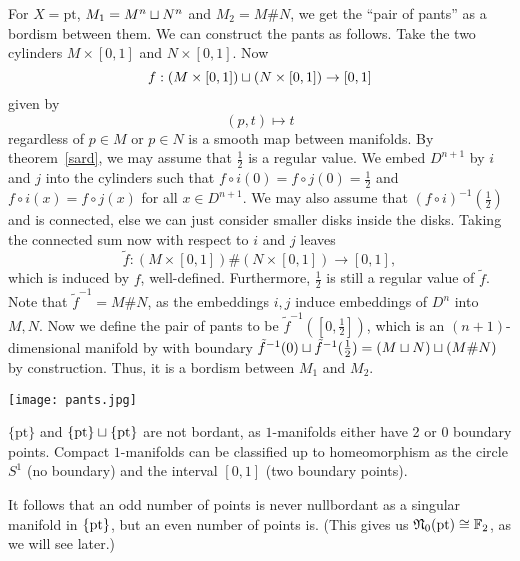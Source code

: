 \documentclass[a4paper,11pt]{article}
\begin{document}
\begin{example}\label{pants}
    For \(X=\mathrm{pt}\), \(M_1=M^n\sqcup N^n\) and \(M_2=M\# N\), we get the \enquote{pair of pants} as a bordism between them. We can construct the pants as follows. Take the two cylinders \(M\times [0,1]\) and \(N\times[0,1]\). Now \[f:(M\times[0,1])\sqcup(N\times[0,1])\to [0,1]\]
    given by
    \[(p,t)\mapsto t\] regardless of \(p\in M\) or \(p\in N\) is a smooth map between manifolds. By theorem\ \ref{sard}, we may assume that \(\frac12\) is a regular value. We embed \(D^{n+1}\) by \(i\) and \(j\) into the cylinders such that \(f\circ i(0)=f\circ j(0)=\frac12\) and \(f\circ i(x)=f\circ j(x)\) for all \(x\in D^{n+1}\). 
    We may also assume that \({(f\circ i)}^{-1}(\frac{1}{2})\) and is connected, else we can just consider smaller disks inside the disks. 
    Taking the connected sum now with respect to \(i\) and \(j\) leaves 
    \[\tilde f:(M\times[0,1])\#(N\times[0,1])\to[0,1],\]
    which is induced  by \(f\), well-defined. Furthermore, \(\frac12\) is still a regular value of \(\tilde f\). 
    Note that \(\tilde{f}^{-1}=M\#N\), as the embeddings \(i,j\) induce embeddings of \(D^n\) into \(M,N\). 
    Now we define the pair of pants to be \(\tilde{f}^{-1}([0,\frac12])\), which is an \((n+1)\)-dimensional manifold by with boundary \(\tilde f^{-1}(0)\sqcup\tilde f^{-1}(\frac12)=(M\sqcup N)\sqcup(M\#N)\) by construction. Thus, it is a bordism between \(M_1\) and \(M_2\).
    \begin{center}
        \texttt{[image: pants.jpg]}
    \end{center}
\end{example}

\begin{example}\label{points}
    \(\{\mathrm{pt}\}\) and \(\{\mathrm{pt}\}\sqcup\{\mathrm{pt}\}\) are not bordant, as \(1\)-manifolds either have 2 or 0 boundary points. Compact \(1\)-manifolds can be classified up to homeomorphism as the circle \(S^1\) (no boundary) and the interval \([0,1]\) (two boundary points). 
\end{example}

\begin{remark}
     It follows that an odd number of points is never nullbordant as a singular manifold in \(\{\mathrm{pt}\}\), but an even number of points is. (This gives us \(\mathfrak{N}_0(\mathrm{pt})\cong\mathbb{F}_2\), as we will see later.)
\end{remark}
\end{document}
